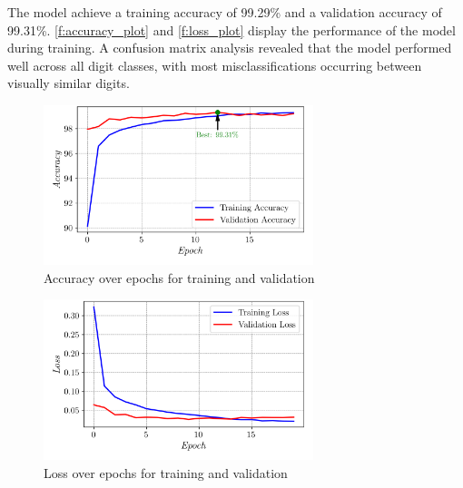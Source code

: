 The model achieve a training accuracy of 99.29\% and a validation accuracy of 99.31\%. \autoref{f:accuracy_plot} 
and \autoref{f:loss_plot} display the performance of the model during training. A confusion matrix analysis 
revealed that the model performed well across all digit classes, with most misclassifications occurring between 
visually similar digits. 

\begin{figure}
  \begin{center}
    \includegraphics[width=0.7\textwidth]{img/result/accuracy_plot.png}
    \caption{Accuracy over epochs for training and validation}
    \label{f:accuracy_plot}
  \end{center}
\end{figure}

\begin{figure}
  \begin{center}
    \includegraphics[width=0.7\textwidth]{img/result/loss_plot.png}
    \caption{Loss over epochs for training and validation}
    \label{f:loss_plot}
  \end{center}
\end{figure}

